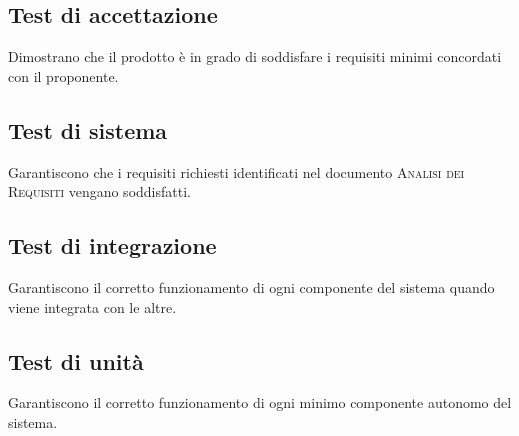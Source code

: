 \documentclass[../piano-di-qualifica.tex]{subfiles}
\begin{document}
\subsection{Test di accettazione}
\label{sub:test_di_accettazione}
Dimostrano che il prodotto è in grado di soddisfare i requisiti minimi concordati con il proponente.

\subsection{Test di sistema}
\label{sub:test_di_sistema}
Garantiscono che i requisiti richiesti identificati nel documento \textsc{Analisi dei Requisiti} vengano soddisfatti. 

\subsection{Test di integrazione}
\label{sub:test_di_integrazione}
Garantiscono il corretto funzionamento di ogni componente del sistema quando viene integrata con le altre.

\subsection{Test di unità}
\label{sub:test_di_unita}
Garantiscono il corretto funzionamento di ogni minimo componente autonomo del sistema.
\end{document}

